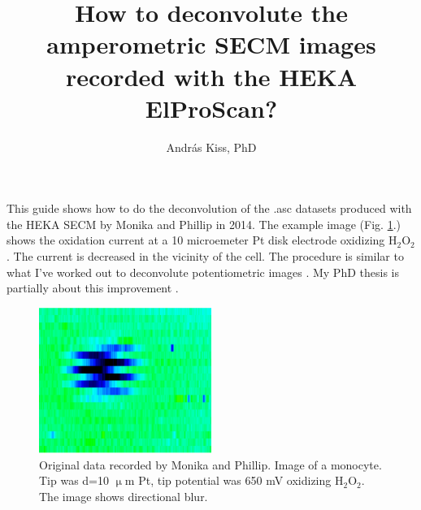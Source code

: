 \documentclass[a4paper, 11pt]{article}
\begin{document}
\title{How to deconvolute the amperometric SECM images recorded with the HEKA ElProScan?}
\author{András Kiss, PhD}
\maketitle

This guide shows how to do the deconvolution of the .asc datasets produced with the HEKA SECM by Monika and Phillip in 2014. The example image (Fig. \ref{fig:original11}.) shows the oxidation current at a 10 microemeter Pt disk electrode oxidizing H$_2$O$_2$. The current is decreased in the vicinity of the cell. The procedure is similar to what I've worked out to deconvolute potentiometric images \cite{kiss2015deconvolution_in, kiss2015deconvolution_of}. My PhD thesis is partially about this improvement \cite{phd}.

\begin{figure}
\centering
\includegraphics[width=0.5\textwidth]{original11.eps}
\caption{Original data recorded by Monika and Phillip. Image of a monocyte. Tip was d=10 $\upmu$m Pt, tip potential was 650 mV oxidizing H$_2$O$_2$. The image shows directional blur.}
\label{fig:original11}
\end{figure}
\end{document}
